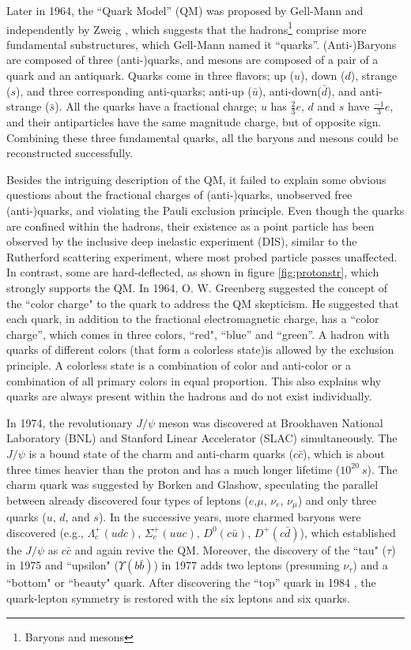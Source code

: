 Later in 1964, the ``Quark Model'' (QM) was proposed by Gell-Mann \cite{GellMann:1964} and independently by Zweig \cite{Zweig:1964}, which suggests that the hadrons\footnote{Baryons and mesons} comprise more fundamental substructures, which Gell-Mann named it ``quarks''. (Anti-)Baryons are composed of three (anti-)quarks, and mesons are composed of a pair of a quark and an antiquark. Quarks come in three flavors; up ($u$), down ($d$), strange ($s$), and three corresponding anti-quarks; anti-up ($\bar{u}$), anti-down($\bar{d}$), and anti-strange ($\bar{s}$). All the quarks have a fractional charge; $u$ has $\frac{2}{3}e$, $d$ and $s$ have $\frac{-1}{3}e$, and their antiparticles have the same magnitude charge, but of opposite sign. Combining these three fundamental quarks, all the baryons and mesons could be reconstructed successfully.  

Besides the intriguing description of the QM, it failed to explain some obvious questions about the fractional charges of (anti-)quarks,  unobserved free (anti-)quarks, and violating the Pauli exclusion principle. Even though the quarks are confined within the hadrons, their existence as a point particle has been observed by the inclusive deep inelastic experiment (DIS), similar to the Rutherford scattering experiment, where most probed particle passes unaffected. In contrast, some are hard-deflected, as shown in figure \ref{fig:protonstr}, which strongly supports the QM. In 1964, O. W. Greenberg suggested the concept of the ``color charge" to the quark to address the QM skepticism. He suggested that each quark, in addition to the fractional electromagnetic charge, has a ``color charge'', which comes in three colors, ``red", ``blue'' and ``green''. A hadron with quarks of different colors (that form a colorless state)is allowed by the exclusion principle. A colorless state is a combination of color and anti-color or a combination of all primary colors in equal proportion. This also explains why quarks are always present within the hadrons and do not exist individually.   

In 1974, the revolutionary $J/\psi$ meson was discovered at Brookhaven National Laboratory (BNL) \cite{E598:1974sol} and Stanford Linear Accelerator (SLAC) \cite{SLAC:1974ind} simultaneously. The $J/\psi$ is a bound state of the charm and anti-charm quarks ($c\bar{c}$)\cite{Clavelli:1974}, which is about three times heavier than the proton and has a much longer lifetime ($10^{20}\ s$). The charm quark was suggested by Borken and Glashow, speculating the parallel between already discovered four types of leptons ($e$,$\mu$, $\nu_{e}$, $\nu_{\mu}$) and only three quarks ($u$, $d$, and $s$). In the successive years, more charmed baryons were discovered (e.g., $\Lambda^+_c (udc)$, $\Sigma_c^+ (uuc)$, $D^0(c\bar{u})$, $D^+(c\bar{d})$), which established the $J/\psi$ as $c\bar{c}$ and again revive the QM. Moreover, the discovery of the ``tau" ($\tau$) in 1975 \cite{Tau:1975} and ``upsilon" ($\Upsilon (b\bar{b})$) in 1977 \cite{Upsilon:1977} adds two leptons (presuming $\nu_{\tau}$) and a ``bottom" or ``beauty" quark. After discovering the ``top'' quark in 1984 \cite{Top:1995}, the quark-lepton symmetry is restored with the six leptons and six quarks. 


